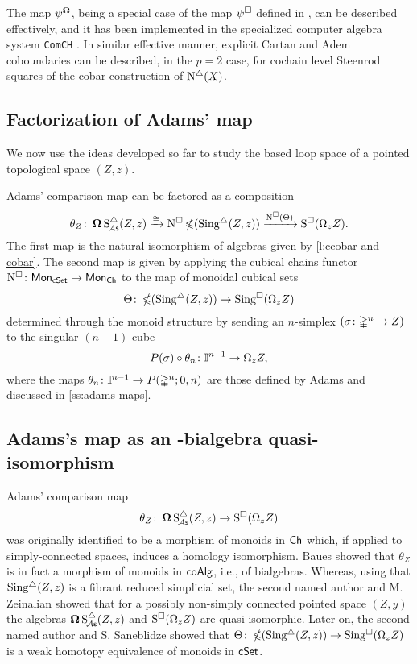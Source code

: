 The map $\psi^{\operatorname{\mathbf{\Omega}}}$, being a special case of the map $\psi^\square$ defined in \cite{medina2021maysteenrod}, can be described effectively, and it has been implemented in the specialized computer algebra system \texttt{ComCH} \cite{medina2021computer}.
In similar effective manner, explicit Cartan and Adem coboundaries \cite{medina2020cartan, medina2021adem} can be described, in the $p = 2$ case, for cochain level Steenrod squares of the cobar construction of $\operatorname{N^{\triangle}}(X)$.

\subsection{Factorization of Adams' map} \label{ss:factorization of adams}

We now use the ideas developed so far to study the based loop space of a pointed topological space $(Z,z)$.

Adams' comparison map can be factored as a composition
\begin{equation} \label{e:factorization of adams}
\theta_Z \colon \operatorname{\mathbf{\Omega}} \operatorname{S^{\triangle}_{\!{\mathcal{A}\mathsf{s}}}}(Z,z) \xrightarrow{\cong}
\operatorname{N^{\square}} \operatorname{\mathbb{\Omega}}(\operatorname{Sing^{\triangle}}(Z,z)) \xrightarrow{\operatorname{N^{\square}}(\Theta)}
\operatorname{S^{\square}}(\Omega_z Z).
\end{equation}
The first map is the natural isomorphism of algebras given by \cref{l:ccobar and cobar}.
The second map is given by applying the cubical chains functor $\operatorname{N^{\square}} \colon \mathsf{Mon}_{\mathsf{cSet}} \to \mathsf{Mon}_{\mathsf{Ch}}$ to the map of monoidal cubical sets
\[
\Theta \colon \operatorname{\mathbb{\Omega}}(\operatorname{Sing^{\triangle}}(Z,z)) \to \operatorname{Sing^{\square}}(\Omega_z Z)
\]
determined through the monoid structure by sending an $n$-simplex $(\sigma \colon \mathbb{\Delta}^n \to Z)$ to the singular $(n-1)$-cube
\[
P(\sigma) \circ \theta_n \colon \mathbb{I}^{n-1} \to \Omega_z Z,
\]
where the maps $\theta_n \colon \mathbb{I}^{n-1} \to P(\mathbb{\Delta}^n;0,n)$ are those defined by Adams and discussed in \cref{ss:adams maps}.

\subsection{Adams's map as an \pdfEinfty-bialgebra quasi-isomorphism}

Adams' comparison map
\[
\theta_Z \colon \operatorname{\mathbf{\Omega}} \operatorname{S^{\triangle}_{\!{\mathcal{A}\mathsf{s}}}}(Z,z) \to \operatorname{S^{\square}}(\Omega_z Z)
\]
was originally identified to be a morphism of monoids in $\mathsf{Ch}$ which, if applied to simply-connected spaces, induces a homology isomorphism.
Baues showed that $\theta_Z$ is in fact a morphism of monoids in $\mathsf{coAlg}$, i.e., of bialgebras.
Whereas, using that $\operatorname{Sing^{\triangle}}(Z,z)$ is a fibrant reduced simplicial set, the second named author and M. Zeinalian \cite{rivera2018cubical} showed that for a possibly non-simply connected pointed space $(Z,y)$ the algebras $\operatorname{\mathbf{\Omega}} \operatorname{S^{\triangle}_{\!{\mathcal{A}\mathsf{s}}}}(Z,z)$ and $\operatorname{S^{\square}}(\Omega_zZ)$ are quasi-isomorphic.
Later on, the second named author and S. Saneblidze
\cite{rivera2019path} showed that $\Theta \colon \operatorname{\mathbb{\Omega}}(\operatorname{Sing^{\triangle}}(Z,z)) \to \operatorname{Sing^{\square}}(\Omega_z Z)$ is a weak homotopy equivalence of monoids in $\mathsf{cSet}$.

